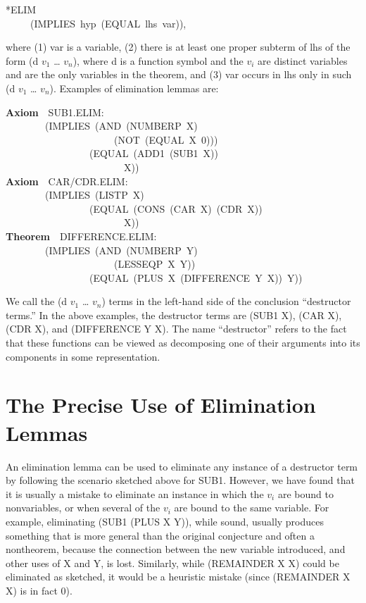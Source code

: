 \documentclass[10pt]{book}
\newenvironment{pubasis}{\begin{flushleft}}{\end{flushleft}}
\newcommand{\axiomordefinition}[1]{\vspace{6pt}\Large\textsf{\textbf{#1}}\normalsize}
\begin{document}
\begin{pubasis}
*ELIM\\
~~~~~(IMPLIES~hyp~(EQUAL~lhs~var)),\\
\end{pubasis}
where (1) var is a variable, (2) there is at least one proper subterm of lhs
of the form (d $v_{1}$ \ldots{} $v_{n}$), where d is a function symbol
and  the $v_{i}$ are distinct
variables and are the only variables in the theorem,
and (3) var occurs in lhs only in such (d $v_{1}$ \ldots{} $v_{n}$).
Examples of elimination lemmas are:
\begin{pubasis}
\axiomordefinition{Axiom}~~SUB1.ELIM:\\
~~~~~~~~(IMPLIES~(AND~(NUMBERP~X)\\
~~~~~~~~~~~~~~~~~~~~~~(NOT~(EQUAL~X~0)))\\
~~~~~~~~~~~~~~~~~(EQUAL~(ADD1~(SUB1~X))\\
~~~~~~~~~~~~~~~~~~~~~~~~X))\\

\axiomordefinition{Axiom}~~CAR/CDR.ELIM:\\
~~~~~~~~(IMPLIES~(LISTP~X)\\
~~~~~~~~~~~~~~~~~(EQUAL~(CONS~(CAR~X)~(CDR~X))\\
~~~~~~~~~~~~~~~~~~~~~~~~X))\\

\axiomordefinition{Theorem}~~DIFFERENCE.ELIM:\\
~~~~~~~~(IMPLIES~(AND~(NUMBERP~Y)\\
~~~~~~~~~~~~~~~~~~~~~~(LESSEQP~X~Y))\\
~~~~~~~~~~~~~~~~~(EQUAL~(PLUS~X~(DIFFERENCE~Y~X))~Y))\\
\end{pubasis}
We call the (d $v_{1}$ \ldots{} $v_{n}$) terms in the left-hand side of the
conclusion ``destructor terms.''  In the above examples, the destructor
terms are (SUB1 X), (CAR X), (CDR X), and (DIFFERENCE Y X).
The name ``destructor'' refers to the fact that these functions can be
viewed as decomposing one of their arguments into its components in some
representation.

\section{The Precise Use of Elimination Lemmas}
An elimination lemma can be used to eliminate any instance of
a destructor term by following the scenario sketched above for SUB1.
However, we have found that it is usually a mistake to eliminate
an instance in which the $v_{i}$ are bound to nonvariables, or
when several of the $v_{i}$ are bound to the same variable.
For example, eliminating (SUB1 (PLUS X Y)), while sound, usually
produces something that is more general than the original conjecture
and often a nontheorem, because the connection between the new variable
introduced, and other uses of X and Y, is lost.  Similarly, while
(REMAINDER X X) could be eliminated as sketched, it would be a
heuristic mistake (since (REMAINDER X X) is in fact 0).
\end{document}
